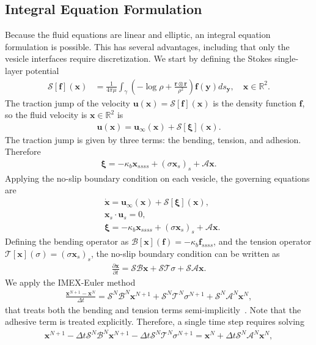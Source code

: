 \documentclass[%
preprint,
 amsmath,amssymb,
 aps,
]{revtex4-1}
\renewcommand{\AA}{\mathcal{A}}
\newcommand{\BB}{\mathcal{B}}
\newcommand{\ff}{\mathbf{f}}
\newcommand{\pderiv}[2]{\frac{\partial #1}{\partial #2}}
\newcommand{\rr}{\mathbf{r}}
\newcommand{\RR}{\mathbb{R}}
\renewcommand{\SS}{\mathcal{S}}
\newcommand{\TT}{\mathcal{T}}
\newcommand{\uu}{\mathbf{u}}
\newcommand{\xx}{\mathbf{x}}
\newcommand{\xxi}{\boldsymbol{\xi}}
\newcommand{\yy}{\mathbf{y}}
\begin{document}
\subsection{Integral Equation Formulation}
Because the fluid equations are linear and elliptic, an integral
equation formulation is possible.  This has several advantages,
including that only the vesicle interfaces require discretization.  We
start by defining the Stokes single-layer potential
\begin{align}
  \SS[\ff](\xx) &= \frac{1}{4\pi\mu} \int_\gamma \left(
    -\log \rho + \frac{\rr \otimes \rr}{\rho^2} \right) 
    \ff(\yy) ds_\yy, \quad \xx \in \RR^2.
  \label{eqn:SLP}
\end{align}
The traction jump of the velocity $\uu(\xx) = \SS[\ff](\xx)$ is the
density function $\ff$, so the fluid velocity is $\xx \in \RR^2$ is
\begin{align*}
  \uu(\xx) = \uu_{\infty}(\xx) + \SS[\xxi](\xx).
\end{align*}
The traction jump is given by three terms: the bending, tension, and
adhesion.  Therefore
\begin{align*}
  \xxi = -\kappa_b \xx_{ssss} + (\sigma \xx_s)_s + \AA \xx.
\end{align*}
Applying the no-slip boundary condition on each vesicle, the governing
equations are
\begin{align*}
  &\dot{\xx} = \uu_{\infty}(\xx) + \SS[\xxi](\xx), \\
  &\xx_s \cdot \uu_s = 0, \\
  &\xxi = -\kappa_b \xx_{ssss} + (\sigma \xx_s)_s + \AA\xx.
\end{align*}
Defining the bending operator as $\BB[\xx](\ff) = -\kappa_b \ff_{ssss}$,
and the tension operator $\TT[\xx](\sigma) = (\sigma \xx_s)_s$, the
no-slip boundary condition can be written as
\begin{align*}
  \pderiv{\xx}{t} = \SS \BB \xx + \SS \TT \sigma + \SS \AA \xx.
\end{align*}
We apply the IMEX-Euler method 
\begin{align*}
  \frac{\xx^{N+1} - \xx^N}{\Delta t} = \SS^N \BB^N \xx^{N+1} + 
  \SS^N \TT^N \sigma^{N+1} + \SS^N \AA^N \xx^N,
\end{align*}
that treats both the bending and tension terms
semi-implicitly~\cite{qua-bir2014}. Note that the adhesive term is
treated explicitly.  Therefore, a single time step requires solving
\begin{align}
  \xx^{N+1} - \Delta t \SS^N \BB^N \xx^{N+1} - 
    \Delta t \SS^N \TT^N \sigma^{N+1} = \xx^N + 
    \Delta t \SS^N \AA^N \xx^N,
  \label{eqn:IMEXEuler}
\end{align}
\end{document}
